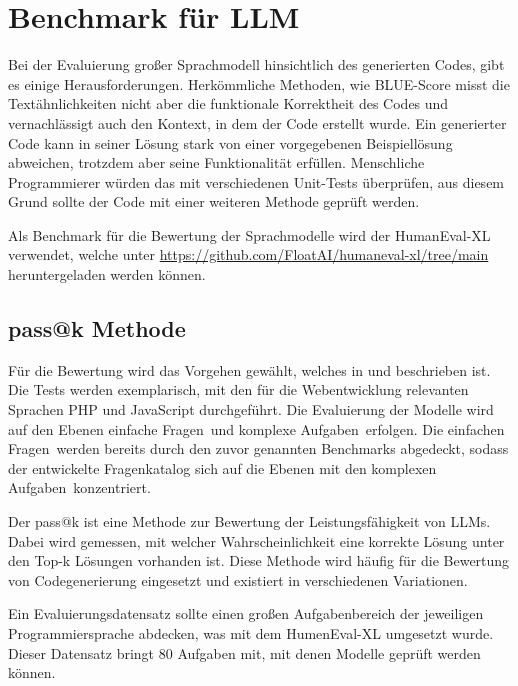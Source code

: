 

\section{Benchmark für LLM}
Bei der Evaluierung großer Sprachmodell hinsichtlich des generierten Codes, gibt es einige Herausforderungen. Herkömmliche Methoden, wie BLUE-Score misst die Textähnlichkeiten nicht aber die funktionale Korrektheit des Codes und vernachlässigt auch den Kontext, in dem der Code erstellt wurde. Ein generierter Code kann in seiner Lösung stark von einer vorgegebenen Beispiellösung abweichen, trotzdem aber seine Funktionalität erfüllen. Menschliche Programmierer würden das mit verschiedenen Unit-Tests überprüfen, aus diesem Grund sollte der Code mit einer weiteren Methode geprüft werden.\vspace{0.2cm}

Als Benchmark für die Bewertung der Sprachmodelle wird der HumanEval-XL verwendet, welche unter \href{https://github.com/FloatAI/humaneval-xl/tree/main}{https://github.com/FloatAI/humaneval-xl/tree/main} heruntergeladen werden können.


\subsection{pass@k Methode}\label{subsec:pass_at_k}
Für die Bewertung wird das Vorgehen gewählt, welches in \cite{chen-2021} und \cite{peng-2024} beschrieben ist. Die Tests werden exemplarisch, mit den für die Webentwicklung relevanten Sprachen PHP und JavaScript durchgeführt. Die Evaluierung der Modelle wird auf den Ebenen \glqq einfache Fragen\grqq \ und \glqq komplexe Aufgaben\grqq \ erfolgen. Die \glqq einfachen Fragen\grqq \ werden bereits durch den zuvor genannten Benchmarks abgedeckt, sodass der entwickelte Fragenkatalog sich auf die Ebenen mit den \glqq komplexen Aufgaben\grqq \ konzentriert.\vspace{0.2cm}

Der pass@k ist eine Methode zur Bewertung der Leistungsfähigkeit von LLMs. Dabei wird gemessen, mit welcher Wahrscheinlichkeit eine korrekte Lösung unter den Top-k Lösungen vorhanden ist. Diese Methode wird häufig für die Bewertung von Codegenerierung eingesetzt und existiert in verschiedenen Variationen.\vspace{0.2cm}

Ein Evaluierungsdatensatz sollte einen großen Aufgabenbereich der jeweiligen Programmiersprache abdecken, was mit dem HumenEval-XL umgesetzt wurde. Dieser Datensatz bringt 80 Aufgaben mit, mit denen Modelle geprüft werden können.\vspace{0.2cm}

